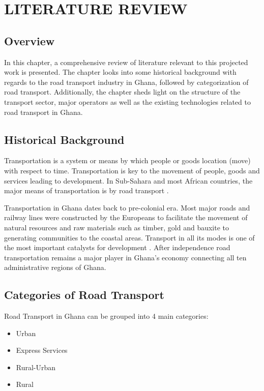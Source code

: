 
\chapter{LITERATURE REVIEW} %
\section{Overview}
In this chapter, a comprehensive review of literature relevant to this projected work is presented. The chapter looks into some historical background with regards to the road transport industry in Ghana, followed by categorization of road transport. Additionally, the chapter sheds light on the structure of the transport sector, major operators as well as the existing technologies related to road transport in Ghana.



\section{Historical Background}
Transportation is a system or means by which people or goods location (move) with respect to time. Transportation is key to the movement of people, goods and services leading to development. In Sub-Sahara and most African countries, the major means of transportation is by road transport \citep{riverson1991intermediate}.

Transportation in Ghana dates back to pre-colonial era. Most major roads and railway lines were constructed by the Europeans to facilitate the movement of natural resources and raw materials such as timber, gold and bauxite to generating communities to the coastal areas. Transport in all its modes is one of the most important catalysts for development \citep{dickson1961development}.
After independence road transportation remains a major player in Ghana's economy connecting all ten administrative regions of Ghana. 

\section{Categories of Road Transport}
Road Transport in Ghana can be grouped into 4 main categories:
\begin{itemize}
	\item Urban
	\item Express Services
	\item Rural-Urban
	\item Rural
\end{itemize}

